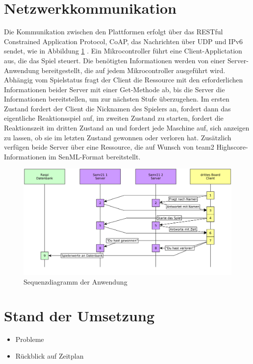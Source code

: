 \documentclass[a4paper]{article}
\begin{document}
\section{Netzwerkkommunikation}
\label{sec:net}
Die Kommunikation zwischen den Plattformen erfolgt über das RESTful Constrained Application Protocol, CoAP, das Nachrichten über UDP und IPv6 sendet, wie in Abbildung \ref{fig:seq_diagram} . Ein Mikrocontroller führt eine Client-Applictation aus, die das Spiel steuert. Die benötigten Informationen werden von einer Server-Anwendung bereitgestellt, die auf jedem Mikrocontroller ausgeführt wird. Abhängig vom Spielstatus fragt der Client die Ressource mit den erforderlichen Informationen beider Server mit einer Get-Methode ab, bis die Server die Informationen bereitstellen, um zur nächsten Stufe überzugehen. Im ersten Zustand fordert der Client die Nicknamen des Spielers an, fordert dann das eigentliche Reaktionsspiel auf, im zweiten Zustand zu starten, fordert die Reaktionszeit im dritten Zustand an und fordert jede Maschine auf, sich anzeigen zu lassen, ob sie im letzten Zustand gewonnen oder verloren hat. Zusätzlich verfügen beide Server über eine Ressource, die auf Wunsch von team2 Highscore-Informationen im SenML-Format bereitstellt.
\begin{figure}[h]
\centering
\includegraphics[scale=0.1]{team1_kommunikation.png}
\caption{\label{fig:seq_diagram}Sequenzdiagramm der Anwendung}
\end{figure}

\section{Stand der Umsetzung}
\label{sec:status}
\begin{itemize}
	\item Probleme
	\item Rückblick auf Zeitplan
\end{itemize}
\end{document}
